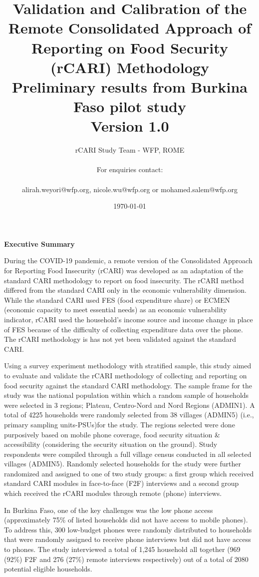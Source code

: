 \documentclass[11pt,harvard]{article}
\author{rCARI Study Team - WFP, ROME \\	\\For enquiries contact:\\		\\alirah.weyori@wfp.org, nicole.wu@wfp.org or mohamed.salem@wfp.org}
\date{\today}
\title{Validation and Calibration of the Remote Consolidated Approach of Reporting on Food Security (rCARI) Methodology 
	\\ {\normalsize Preliminary results from Burkina Faso pilot study} 
	\\{\normalsize{Version 1.0}} }
\begin{document}
	\maketitle \vspace{-1cm}
	\onehalfspacing
	\pagebreak
	\setlength{\parskip}{6pt} %
	\tableofcontents
	\pagebreak
	
	
	\textbf{Executive Summary}
	
	During the COVID-19 pandemic, a remote version of the Consolidated Approach for Reporting Food Insecurity (rCARI) was developed as an adaptation of the standard CARI methodology to report on food insecurity. The rCARI method differed from the standard CARI only in the economic vulnerability dimension. While the standard CARI used FES (food expenditure share) or ECMEN (economic capacity to meet essential needs) as an economic vulnerability indicator, rCARI used the household’s income source and income change in place of FES because of the difficulty of collecting expenditure data over the phone. The rCARI methodology is has not yet been validated against the standard CARI. 
	
	Using a survey experiment methodology with stratified sample, this study aimed to evaluate and validate the rCARI methodology of collecting and reporting on food security against the standard CARI methodology. The sample frame for the study was the national population within which a random sample of households were selected in 3 regions; Plateau, Centro-Nord and Nord Regions (ADMIN1). A total of 4225 households were randomly selected from 38 villages (ADMIN5) (i.e., primary sampling units-PSUs)for the study. The regions selected were done purposively based on mobile phone coverage, food security situation \& accessibility (considering the security situation on the ground). Study respondents were compiled through a full village census conducted in all selected villages (ADMIN5). Randomly selected households for the study were further randomized and assigned to one of two study groups: a first group which received standard CARI modules in face-to-face (F2F) interviews and a second group which received the rCARI modules through remote (phone) interviews. 
	
	In Burkina Faso, one of the key challenges was the low phone access (approximately 75\% of listed households did not have access to mobile phones). To address this, 300 low-budget phones were randomly distributed to households that were randomly assigned to receive phone interviews but did not have access to phones. The study interviewed a total of 1,245 household all together (969 (92\%) F2F and 276 (27\%) remote interviews respectively) out of a total of 2080 potential eligible households.
	
\end{document}
